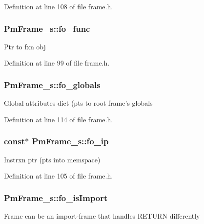Definition at line 108 of file frame.\-h.

\hypertarget{struct_pm_frame__s_a019782d26f22cdd2a08464d9ad463fdc}{
\subsubsection[{fo\-\_\-func}]{ Pm\-Frame\-\_\-s\-::fo\-\_\-func}}\label{struct_pm_frame__s_a019782d26f22cdd2a08464d9ad463fdc}
Ptr to fxn obj 

Definition at line 99 of file frame.\-h.

\hypertarget{struct_pm_frame__s_aac8ced4f070e0e9d071fa9c361195b71}{
\subsubsection[{fo\-\_\-globals}]{ Pm\-Frame\-\_\-s\-::fo\-\_\-globals}}\label{struct_pm_frame__s_aac8ced4f070e0e9d071fa9c361195b71}
Global attributes dict (pts to root frame's globals 

Definition at line 114 of file frame.\-h.

\hypertarget{struct_pm_frame__s_a84b1a72fd9d6791fe887d05c5848d8c6}{
\subsubsection[{fo\-\_\-ip}]{ {\bf const}$\ast$ Pm\-Frame\-\_\-s\-::fo\-\_\-ip}}\label{struct_pm_frame__s_a84b1a72fd9d6791fe887d05c5848d8c6}
Instrxn ptr (pts into memspace) 

Definition at line 105 of file frame.\-h.

\hypertarget{struct_pm_frame__s_aa4786cc606fdf9b74d60454287788854}{
\subsubsection[{fo\-\_\-is\-Import}]{ Pm\-Frame\-\_\-s\-::fo\-\_\-is\-Import}}\label{struct_pm_frame__s_aa4786cc606fdf9b74d60454287788854}
Frame can be an import-\/frame that handles R\-E\-T\-U\-R\-N differently 

